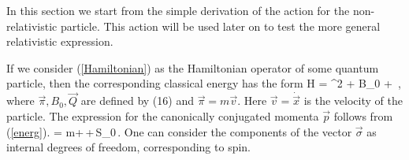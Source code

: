 In this section we start from the 
simple derivation of the action for the non-relativistic particle.
This action will be used later on to test the more general 
relativistic expression.

If we consider (\ref{Hamiltonian}) as the Hamiltonian operator 
of some quantum particle, then the corresponding classical 
energy has the form
\beq
H =  \vec{\pi}^2 + B_0 + \vec{\sigma}\cdot{} \,,
\label{energ}
\eeq
where $\vec{\pi}, B_0, \vec{Q}$ are defined by (16) and
$\vec{\pi} = m \vec{v}$. Here $\vec{v} = \dot{\vec{x}}$
is the velocity of the particle. The expression for the canonically 
conjugated momenta $\vec{p}$ follows from  (\ref{energ}).
\beq
{} 
= m+\,+\,\vec{\sigma}S_0\,.
\label{moment}
\eeq
One can consider the components of the vector $\vec{\sigma}$ as
internal degrees of freedom, corresponding to spin.


